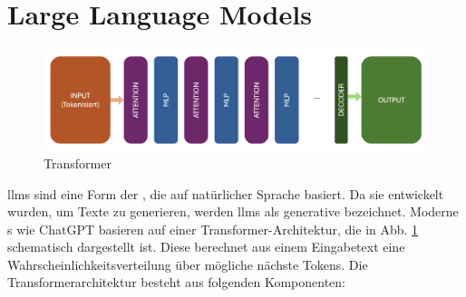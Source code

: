 \documentclass[../main.tex]{subfiles}
\begin{document}
\section{Large Language Models}
\label{sec:llm}

\begin{figure}[h!]
  \includegraphics[scale=0.37]{bilder/Transformer.png}
  \caption{Transformer}
  \label{fig:trans}
\end{figure}

\glspl{llm} sind eine Form der , die auf natürlicher Sprache basiert. Da sie entwickelt wurden, um Texte zu generieren, werden \glspl{llm} als generative 
 bezeichnet. Moderne s wie ChatGPT basieren auf einer Transformer-Architektur, die in Abb. \ref{fig:trans} schematisch dargestellt ist. Diese 
berechnet aus einem Eingabetext eine Wahrscheinlichkeitsverteilung über mögliche nächste Tokens. Die Transformerarchitektur besteht aus folgenden Komponenten:\cite{architecture}\\
\end{document}
